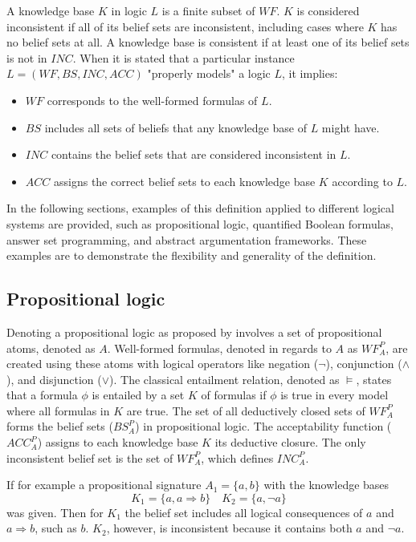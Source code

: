 A knowledge base \(K\) in logic \(L\) is a finite subset of \(WF\).
\(K\) is considered inconsistent if all of its belief sets are inconsistent, including cases where \(K\) has no belief sets at all.
A knowledge base is consistent if at least one of its belief sets is not in \(INC\).
When it is stated that a particular instance \(L = (WF, BS, INC, ACC)\) "properly models" a logic \(L\), it implies:
\begin{itemize}
      \item \(WF\) corresponds to the well-formed formulas of \(L\).
      \item \(BS\) includes all sets of beliefs that any knowledge base of \(L\) might have.
      \item \(INC\) contains the belief sets that are considered inconsistent in \(L\).
      \item \(ACC\) assigns the correct belief sets to each knowledge base \(K\) according to \(L\).
\end{itemize}

In the following sections, examples of this definition applied to different logical systems are provided, such as propositional logic, quantified Boolean formulas, answer set programming, and abstract argumentation frameworks. These examples are to demonstrate the flexibility and generality of the definition.

\subsection{Propositional logic}
Denoting a propositional logic as proposed by \cite{gelfond_classical_1991} involves a set of propositional atoms, denoted as \(A\).
Well-formed formulas, denoted in regards to \(A\) as \(WF^P_A\), are created using these atoms with logical operators like negation (\(\neg\)), conjunction (\(\land\)), and disjunction (\(\lor\)).
The classical entailment relation, denoted as \(\models\), states that a formula \(\phi\) is entailed by a set \(K\) of formulas if \(\phi\) is true in every model where all formulas in \(K\) are true.
The set of all deductively closed sets of \(WF^P_A\) forms the belief sets (\(BS^P_A\)) in propositional logic.
The acceptability function (\(ACC^P_A\)) assigns to each knowledge base \(K\) its deductive closure.
The only inconsistent belief set is the set of \(WF^P_A\), which defines \(INC^P_A\).

If for example a propositional signature \(A_1 = \{a,b\}\) with the knowledge bases
\[K_1 = \{a, a \Rightarrow b\} \quad K_2 = \{a, \neg a\}\]
was given.
Then for \(K_1\) the belief set includes all logical consequences of \(a\) and \(a \Rightarrow b\), such as \(b\).
\(K_2\), however, is inconsistent because it contains both \(a\) and \(\neg a\).


